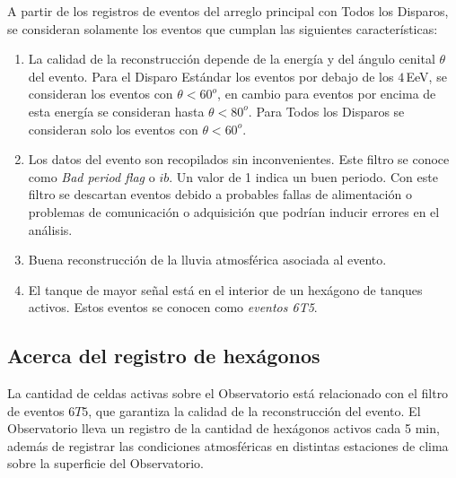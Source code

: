 A partir de los registros de eventos del arreglo principal con Todos los Disparos, se consideran solamente los eventos que cumplan las siguientes características:

    \begin{enumerate}
      \item La calidad de la reconstrucción depende de la energía y del ángulo cenital $\theta$ del evento.  Para el Disparo Estándar los eventos por debajo de los $4\,$EeV, se consideran los eventos con $\theta < 60^o$, en cambio para eventos por encima de esta energía se consideran hasta $\theta < 80^o$. Para Todos los Disparos se consideran solo los eventos con $\theta<60^o$.
      \item Los datos del evento son recopilados sin inconvenientes. Este filtro se conoce como \emph{Bad period flag} o $ib$. Un valor de 1 indica un buen periodo. Con este filtro se descartan eventos debido a probables fallas de alimentación o problemas de comunicación o adquisición que podrían inducir errores en el análisis.
      \item Buena reconstrucción de la lluvia atmosférica asociada al evento.
      \item El tanque de mayor señal está en el interior de un hexágono de tanques activos. Estos eventos se conocen como \textit{eventos 6T5}.
    \end{enumerate}


\subsection{Acerca del registro de hexágonos}\label{hexagonos_rate}

La cantidad de celdas  activas sobre el Observatorio está relacionado con el filtro de eventos $6T5$, que garantiza la calidad de la reconstrucción del evento. El Observatorio lleva un registro de la cantidad de hexágonos activos cada 5 min, además de registrar las condiciones atmosféricas en distintas estaciones de clima sobre la superficie del Observatorio. 


